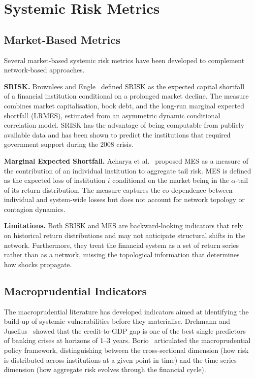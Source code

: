 \section{Systemic Risk Metrics}
\label{sec:risk_metrics_background}

\subsection{Market-Based Metrics}
\label{sec:market_metrics}

Several market-based systemic risk metrics have been developed to
complement network-based approaches.

\textbf{SRISK.}  Brownlees and Engle~\cite{brownlees2017srisk} defined
SRISK as the expected capital shortfall of a financial institution
conditional on a prolonged market decline.  The measure combines
market capitalisation, book debt, and the long-run marginal expected
shortfall (LRMES), estimated from an asymmetric dynamic conditional
correlation model.  SRISK has the advantage of being computable from
publicly available data and has been shown to predict the institutions
that required government support during the 2008 crisis.

\textbf{Marginal Expected Shortfall.}  Acharya et
al.~\cite{acharya2017measuring} proposed MES as a measure of the
contribution of an individual institution to aggregate tail risk.  MES
is defined as the expected loss of institution $i$ conditional on the
market being in the $\alpha$-tail of its return distribution.  The
measure captures the co-dependence between individual and system-wide
losses but does not account for network topology or contagion dynamics.

\textbf{Limitations.}  Both SRISK and MES are backward-looking
indicators that rely on historical return distributions and may not
anticipate structural shifts in the network.  Furthermore, they treat
the financial system as a set of return series rather than as a network,
missing the topological information that determines how shocks propagate.

\subsection{Macroprudential Indicators}
\label{sec:macropru}

The macroprudential literature has developed indicators aimed at
identifying the build-up of systemic vulnerabilities before they
materialise.  Drehmann and Juselius~\cite{drehmann2013model} showed
that the credit-to-GDP gap is one of the best single predictors of
banking crises at horizons of 1--3 years.  Borio~\cite{borio2011macroprudential}
articulated the macroprudential policy framework, distinguishing between
the cross-sectional dimension (how risk is distributed across
institutions at a given point in time) and the time-series dimension
(how aggregate risk evolves through the financial cycle).

